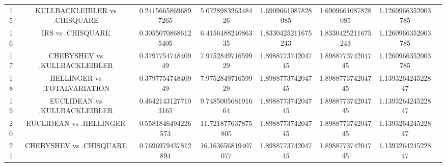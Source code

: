 \documentclass[a4paper,10pt]{article}
\begin{document}
\begin{landscape}
\begin{table}[!htp]
\begin{tabular}{cccccccc}
15&KULLBACKLEIBLER vs .CHISQUARE&0.24156658696897265&5.072898326348426&1.6909661087828085&1.6909661087828085&1.1260966352003785\\
16&IRS vs .CHISQUARE&0.30550708686125405&6.415648824086335&1.8330425211675243&1.8330425211675243&1.1260966352003785\\
17&CHEBYSHEV vs .KULLBACKLEIBLER&0.379775474840949&7.975284971659929&1.898877374204745&1.898877374204745&1.1260966352003785\\
18&HELLINGER vs .TOTALVARIATION&0.379775474840949&7.975284971659929&1.898877374204745&1.898877374204745&1.139326424522847\\
19&EUCLIDEAN vs .KULLBACKLEIBLER&0.46421431277103165&9.748500568191664&1.898877374204745&1.898877374204745&1.139326424522847\\
20&EUCLIDEAN vs .HELLINGER&0.5581846494226573&11.721877637875805&1.898877374204745&1.898877374204745&1.139326424522847\\
21&CHEBYSHEV vs .CHISQUARE&0.7696979437812894&16.163656819407077&1.898877374204745&1.898877374204745&1.139326424522847\\
\hline
\end{tabular}
\end{table}

\end{landscape}
\end{document}
